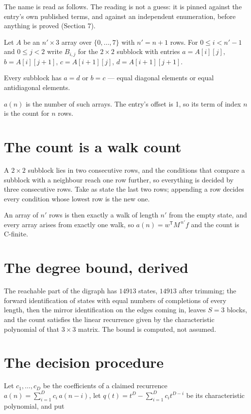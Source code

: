 \documentclass[11pt]{article}
\theoremstyle{definition}
\begin{document}
The name is read as follows. The reading is not a guess: it is pinned against the entry's own published terms, and against an independent enumeration, before anything is proved (Section 7).

Let $A$ be an $n' \times 3$ array over $\{0,\dots,7\}$ with $n' = n + 1$ rows. For $0 \le i < n'-1$ and $0 \le j < 2$ write $B_{i,j}$ for the $2\times2$ subblock with entries $a = A[i][j]$, $b = A[i][j{+}1]$, $c = A[i{+}1][j]$, $d = A[i{+}1][j{+}1]$.

Every subblock has $a = d$ or $b = c$ --- equal diagonal elements or equal antidiagonal elements.

$a(n)$ is the number of such arrays. The entry's offset is 1, so its term of index $n$ is the count for $n$ rows.

\section{The count is a walk count}

A $2\times2$ subblock lies in two consecutive rows, and the conditions that compare a subblock with a neighbour reach one row further, so everything is decided by three consecutive rows. Take as state the last two rows; appending a row decides every condition whose lowest row is the new one.

An array of $n'$ rows is then exactly a walk of length $n'$ from the empty state, and every array arises from exactly one walk, so $a(n) = w^{\mathsf T}M^{\,n'}f$ and the count is C-finite.

\section{The degree bound, derived}

The reachable part of the digraph has $14913$ states, $14913$ after trimming; the forward identification of states with equal numbers of completions of every length, then the mirror identification on the edges coming in, leaves $S = 3$ blocks, and the count satisfies the linear recurrence given by the characteristic polynomial of that $3\times3$ matrix. The bound is computed, not assumed.

\section{The decision procedure}

Let $c_1,\dots,c_D$ be the coefficients of a claimed recurrence $a(n) = \sum_{i=1}^{D} c_i\,a(n-i)$, let $q(t) = t^{D} - \sum_{i=1}^{D} c_i t^{D-i}$ be its characteristic polynomial, and put
\end{document}
